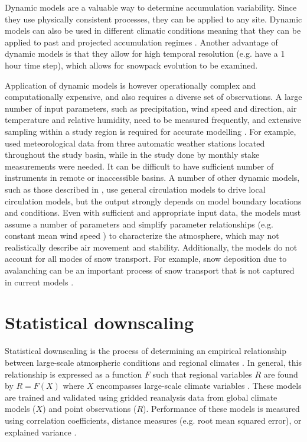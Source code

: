 \documentclass{sfuthesis}
\begin{document}
\begin{appendices}
Dynamic models are a valuable way to determine accumulation variability. Since they use physically consistent processes, they can be applied to any site. Dynamic models can also be used in different climatic conditions meaning that they can be applied to past and projected accumulation regimes \citep{Clark2011}. Another advantage of dynamic models is that they allow for high temporal resolution (e.g. \cite{Mott2008} have a 1 hour time step), which allows for snowpack evolution to be examined.

Application of dynamic models is however operationally complex and computationally expensive, and also requires a diverse set of observations. A large number of input parameters, such as precipitation, wind speed and direction, air temperature and relative humidity, need to be measured frequently, and extensive sampling within a study region is required for accurate modelling \citep{Liston2006}. For example, \cite{Dadic2010} used meteorological data from three automatic weather stations located throughout the study basin, while in the study done by \cite{Mott2008} monthly stake measurements were needed. It can be difficult to have sufficient number of instruments in remote or inaccessible basins. A number of other dynamic models, such as those described in \cite{Fowler2007}, use general circulation models to drive local circulation models, but the output strongly depends on model boundary locations and conditions.  Even with sufficient and appropriate input data, the models must assume a number of parameters and simplify parameter relationships (e.g. constant mean wind speed \citep{Mott2008}) to characterize the atmosphere, which may not realistically describe air movement and stability. Additionally, the models do not account for all modes of snow transport. For example, snow deposition due to avalanching can be an important process of snow transport that is not captured in current models \citep{Mott2008}. 

\section{Statistical downscaling}

Statistical downscaling is the process of determining an empirical relationship between large-scale atmospheric conditions and regional climates \citep{Fowler2007}. In general, this relationship is expressed as a function $F$ such that regional variables $R$ are found by $R=F(X)$ where $X$ encompasses large-scale climate variables \citep{Fowler2007}. These models are trained and validated using gridded reanalysis data from global climate models ($X$) and point observations ($R$). Performance of these models is measured using correlation coefficients, distance measures (e.g. root mean squared error), or explained variance \citep{Fowler2007}. 


\end{appendices}
\end{document}
